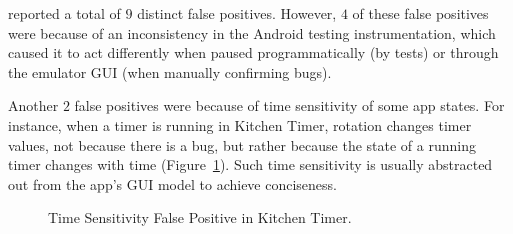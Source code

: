 \tool{} reported a total of $9$ distinct false positives. However, $4$ of these false positives were because of an inconsistency in the Android testing instrumentation, which caused it to act differently when paused programmatically (by tests) or through the emulator GUI (when manually confirming bugs). 

Another $2$ false positives were because of time sensitivity of some app states. For instance, when a timer is running in Kitchen Timer, rotation changes timer values, not because there is a bug, but rather because the state of a running timer changes with time (Figure~\ref{fig:fp6}). Such time sensitivity is usually abstracted out from the app's GUI model to achieve conciseness. 

\begin{figure}[!t]
\centering
\begin{minipage}{.6\columnwidth}
\hfill
{}
\caption{Time Sensitivity False Positive in Kitchen Timer.}
\label{fig:fp6}
\end{minipage}
\end{figure}

